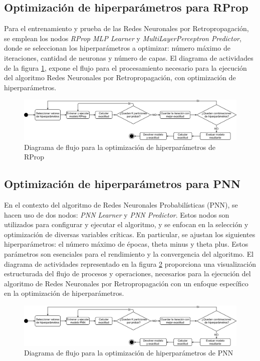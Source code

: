 \subsection{Optimización de hiperparámetros para RProp}
Para el entrenamiento y prueba de las Redes Neuronales por Retropropagación, se emplean los nodos \textit{RProp MLP Learner} y \textit{MultiLayerPerceptron Predictor}, donde se seleccionan los hiperparámetros a optimizar: número máximo de iteraciones, cantidad de neuronas y número de capas. El diagrama de actividades de la figura \ref{fig:optimizacion-rprop}, expone el flujo para el procesamiento necesario para la ejecución del algoritmo Redes Neuronales por Retropropagación, con optimización de hiperparámetros.

\begin{figure}[H]
	\centering
	\includegraphics[width=1\linewidth]{"figuras/capi 2/hpo/Optimizacion RProp"}
	\caption{Diagrama de flujo para la optimización de hiperparámetros de RProp}
	\label{fig:optimizacion-rprop}
\end{figure}


\subsection{Optimización de hiperparámetros para PNN}
En el contexto del algoritmo de Redes Neuronales Probabilísticas (PNN), se hacen uso de dos nodos: \textit{PNN Learner} y \textit{PNN Predictor}. Estos nodos son utilizados para configurar y ejecutar el algoritmo, y se enfocan en la selección y optimización de diversas variables críticas. En particular, se ajustan los siguientes hiperparámetros: el número máximo de épocas, theta minus y theta plus. Estos parámetros son esenciales para el rendimiento y la convergencia del algoritmo. El diagrama de actividades representado en la figura \ref{fig:optimizacion-pnn} proporciona una visualización estructurada del flujo de procesos y operaciones, necesarios para la ejecución del algoritmo de Redes Neuronales por Retropropagación con un enfoque específico en la optimización de hiperparámetros.

\begin{figure}[H]
	\centering
	\includegraphics[width=1\linewidth]{"figuras/capi 2/hpo/Optimizacion PNN"}
	\caption{Diagrama de flujo para la optimización de hiperparámetros de PNN}
	\label{fig:optimizacion-pnn}
\end{figure}


